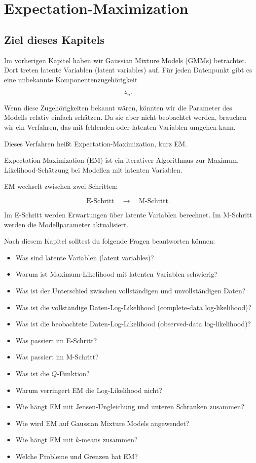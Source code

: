 \chapter{Expectation-Maximization}

\section{Ziel dieses Kapitels}

Im vorherigen Kapitel haben wir Gaussian Mixture Models (GMMs) betrachtet.
Dort treten latente Variablen (latent variables) auf.
Für jeden Datenpunkt gibt es eine unbekannte Komponentenzugehörigkeit

\[
    z_n.
\]

Wenn diese Zugehörigkeiten bekannt wären, könnten wir die Parameter des Modells relativ einfach schätzen.
Da sie aber nicht beobachtet werden, brauchen wir ein Verfahren, das mit fehlenden oder latenten Variablen umgehen kann.

Dieses Verfahren heißt Expectation-Maximization, kurz EM.

\begin{conceptbox}
Expectation-Maximization (EM) ist ein iterativer Algorithmus zur Maximum-Likelihood-Schätzung bei Modellen mit latenten Variablen.

EM wechselt zwischen zwei Schritten:

\[
    \text{E-Schritt}
    \quad
    \longrightarrow
    \quad
    \text{M-Schritt}.
\]

Im E-Schritt werden Erwartungen über latente Variablen berechnet.
Im M-Schritt werden die Modellparameter aktualisiert.
\end{conceptbox}

Nach diesem Kapitel solltest du folgende Fragen beantworten können:

\begin{itemize}
    \item Was sind latente Variablen (latent variables)?
    \item Warum ist Maximum-Likelihood mit latenten Variablen schwierig?
    \item Was ist der Unterschied zwischen vollständigen und unvollständigen Daten?
    \item Was ist die vollständige Daten-Log-Likelihood (complete-data log-likelihood)?
    \item Was ist die beobachtete Daten-Log-Likelihood (observed-data log-likelihood)?
    \item Was passiert im E-Schritt?
    \item Was passiert im M-Schritt?
    \item Was ist die \(Q\)-Funktion?
    \item Warum verringert EM die Log-Likelihood nicht?
    \item Wie hängt EM mit Jensen-Ungleichung und unteren Schranken zusammen?
    \item Wie wird EM auf Gaussian Mixture Models angewendet?
    \item Wie hängt EM mit \(k\)-means zusammen?
    \item Welche Probleme und Grenzen hat EM?
\end{itemize}

